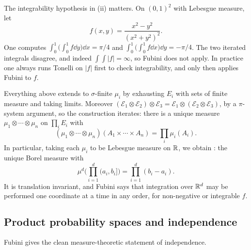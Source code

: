 \documentclass[a4paper]{scrartcl}
\newcommand{\cE}{\mathcal{E}}
\begin{document}
\begin{remark}
	The integrability hypothesis in (ii) matters. On $(0,1)^2$ with Lebesgue measure, let
	$$
	f(x,y) = \frac{x^2-y^2}{(x^2+y^2)^2}.
	$$
	One computes $\int_0^1\big(\int_0^1 f\dd y\big)\dd x = \pi/4$ and $\int_0^1\big(\int_0^1 f\dd x\big)\dd y = -\pi/4$. The two iterated integrals disagree, and indeed $\int\int|f| = \infty$, so Fubini does not apply. In practice one always runs Tonelli on $|f|$ first to check integrability, and only then applies Fubini to $f$.
\end{remark}

\begin{remark}
	Everything above extends to $\sigma$-finite $\mu_i$ by exhausting $E_i$ with sets of finite measure and taking limits. Moreover $(\cE_1\otimes\cE_2)\otimes\cE_3 = \cE_1\otimes(\cE_2\otimes\cE_3)$, by a $\pi$-system argument, so the construction iterates: there is a unique measure $\mu_1\otimes\cdots\otimes\mu_n$ on $\prod_i E_i$ with
	$$
	(\mu_1\otimes\cdots\otimes\mu_n)(A_1\times\cdots\times A_n)=\prod_i \mu_i(A_i).
	$$
	In particular, taking each $\mu_i$ to be Lebesgue measure on $\mathbb{R}$, we obtain : the unique Borel measure with
	$$
	\mu^d\Big(\prod_{i=1}^d (a_i,b_i]\Big) = \prod_{i=1}^d (b_i-a_i).
	$$
	It is translation invariant, and Fubini says that integration over $\mathbb{R}^d$ may be performed one coordinate at a time in any order, for non-negative or integrable $f$.
\end{remark}

\subsection{Product probability spaces and independence}

Fubini gives the clean measure-theoretic statement of independence.
\end{document}
